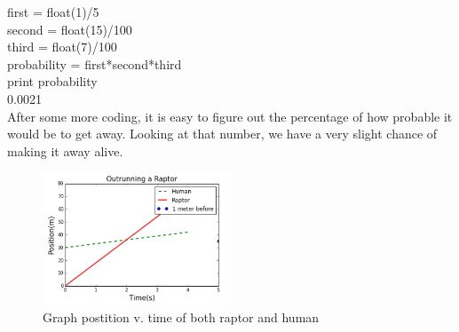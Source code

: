 \documentclass[twocolumn]{article}
\begin{document}
first = float(1)/5\\
second = float(15)/100\\
third = float(7)/100\\
probability = first*second*third\\
print probability\\
0.0021\\
After some more coding, it is easy to figure out the percentage of how probable it would be to get away. Looking at that number, we have a very slight chance of making it away alive.
\begin{figure}[h!]
	\includegraphics[width=0.5\textwidth]{capture.png}
	\caption{Graph postition v. time of both raptor and human}
\end{figure}
\end{document}
